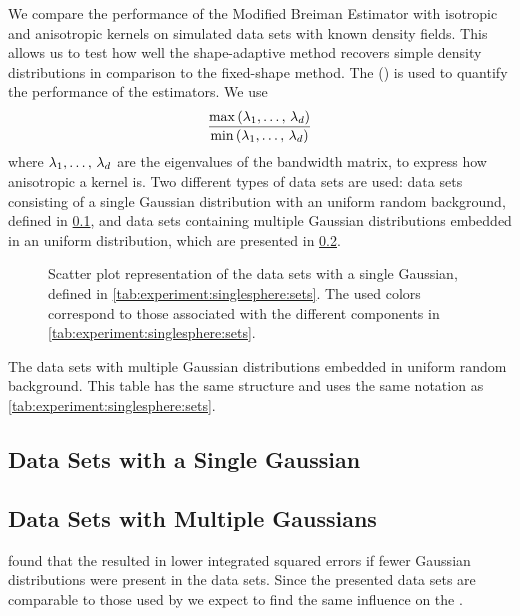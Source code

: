 We compare the performance of the Modified Breiman Estimator with isotropic and anisotropic kernels on simulated data sets with known density fields. This allows us to test how well the shape-adaptive method recovers simple density distributions in comparison to the fixed-shape method.
The \mse (\MSE) is used to quantify the performance of the estimators. We use
\begin{equation*}\label{eq:experiment:anisotropicmetric}
	\frac{\max\left(\lambda_1, \dotsc,\, \lambda_d \right)}{\min\left(\lambda_1, \dotsc,\, \lambda_d \right)}
\end{equation*}
where $\lambda_1, \dotsc,\, \lambda_d$ are the eigenvalues of the bandwidth matrix, to express how anisotropic a kernel is.
Two different types of data sets are used: data sets consisting of a single Gaussian distribution with an uniform random background, defined in \cref{s:experiment:singlesphere}, and data sets containing multiple Gaussian distributions embedded in an uniform distribution, which are presented in \cref{s:experiment:multisphere}.

\begin{figure*}
	\centering
	
	\caption{Scatter plot representation of the data sets with a single Gaussian, defined in \cref{tab:experiment:singlesphere:sets}. The used colors correspond to those associated with the different components in \cref{tab:experiment:singlesphere:sets}.}
	\label{fig:experiment:singlesphere:sets}
\end{figure*}

\begin{table*}
	\centering
	
	\caption{The data sets with multiple Gaussian distributions embedded in uniform random background. This table has the same structure and uses the same notation as \cref{tab:experiment:singlesphere:sets}.}
	\label{tab:experiment:multisphere:sets}
\end{table*}

\subsection{Data Sets with a Single Gaussian}
\label{s:experiment:singlesphere}


\subsection{Data Sets with Multiple Gaussians}
\label{s:experiment:multisphere}


\textcite{ferdosi2011comparison} found that the \mbe resulted in lower integrated squared errors if fewer Gaussian distributions were present in the data sets. Since the presented data sets are comparable to those used by \citeauthor{ferdosi2011comparison} we expect to find the same influence on the \mse.
